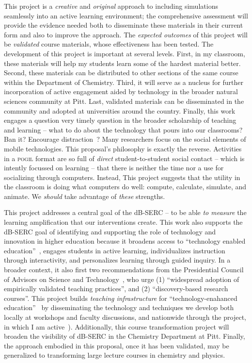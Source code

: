 \documentclass[10pt,letterpaper]{article}
\begin{document}
This project is a \textit{creative} and \textit{original} approach to including simulations seamlessly into an active learning environment; the comprehensive assessment will provide the evidence needed both to disseminate these materials in their current form and also to improve the approach. 
The \textit{expected outcomes} of this project will be \textit{validated} course materials, whose effectiveness has been tested. The development of this project is important at several levels. First, in my classroom, these materials will help my students learn some of the hardest material better. Second, these materials can be distributed to other sections of the same course within the Department of Chemistry. Third, it will serve as a nucleus for further incorporation of active engagement aided by technology in the broader natural sciences community at Pitt. Last, validated materials can be disseminated in the \pogil community and adopted at universities around the country. 
%
Finally, this work engages a question very timely question in the broader scholarship of teaching and learning -- what to do about the technology that pours into our classrooms? Ban it? Encourage distraction~\cite{farmanCHEblog-12}? 
Many researchers focus on the social elements of mobile technologies. This proposal's philosophy is exactly the reverse. Activities in a \textsc{pogil} format are so full of \textit{direct} student-to-student social contact -- which is intently focussed on learning -- that there is neither the time nor a use for socializing through computers. Instead, 
This project suggests that the utility in the classroom is doing what computers do well: compute, calculate, simulate, and animate. We \textit{should} take advantage of \textit{these} strengths.

This project addresses a central goal of the dB-SERC -- to be able \textit{to measure} the learning amplification that our interventions create. This work also supports the dB-SERC goal of identifying and supporting the role of technology and innovation in higher education because it broadens access to ``technology enabled education''~\cite{Zuckerman2013}, engages students in active learning, individualizes instruction through interactivity, and personalizes learning through guided inquiry.  In a broader context, it also first two recommendations from the Presidential Council of Advisors on Science and Technology~\cite{PCAST2012}, who urge (1) ``widespread adoption of empirically validated teaching practices'', and (2) ``discovery-based research courses''. This project builds \textit{teaching infrastructure} for ``technology-enahanced education''~\cite{Zuckerman2013} by disseminating the technology and techniques we develop both locally at workshops and faculty discussions, and nationwide through the \pogil project, in which I am active~\cite{sgrACS-14a}). 
Additionally, this course transformation project will broaden the visibility of dB-SERC in the Chemistry Department at Pitt. Finally, the approach embodied in this proposal, once it has been validated, may be generalized to transforming large lecture courses in chemistry and physics.
\end{document}
